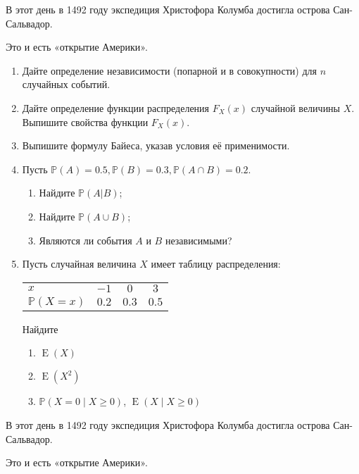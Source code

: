 \documentclass[12pt]{article}
\DeclareMathOperator{\E}{E}
\def \P{\mathbb{P}}
\begin{document}
В этот день в 1492 году экспедиция Христофора Колумба достигла острова Сан-Сальвадор. 

Это и есть «открытие Америки».

\begin{enumerate}
\item Дайте определение независимости (попарной и в совокупности) для $n$ случайных событий.
\item Дайте определение функции распределения $F_{X}(x)$ случайной величины $X$. 
Выпишите свойства функции $F_{X}(x)$. 
\item Выпишите формулу Байеса, указав условия её применимости.

\item  Пусть $\P(A) = 0.5, \P(B) = 0.3, \P(A\cap B) = 0.2$.
\begin{enumerate}
  \item  Найдите $\P(A|B)$;
  \item  Найдите $\P(A\cup B)$;
  \item  Являются ли события $A$ и $B$ независимыми?
\end{enumerate}

\item  Пусть случайная величина $X$ имеет таблицу распределения: %

\begin{tabular}{lccc}
\toprule
$x$ & $-1$  & $0$  & $3$ \\
$\P(X = x)$ & $0.2$ & $0.3$  & $0.5$ \\
\bottomrule
\end{tabular}

Найдите
\begin{enumerate}
	\item $\E(X)$
	\item $\E\left(X^2\right)$
	\item $\P(X=0 \mid X \geq 0)$, $\E(X \mid X \geq 0)$
\end{enumerate}

\end{enumerate}

\newpage

В этот день в 1492 году экспедиция Христофора Колумба достигла острова Сан-Сальвадор. 

Это и есть «открытие Америки».
\end{document}

